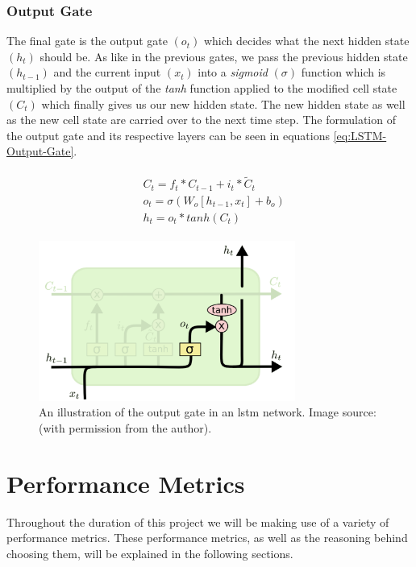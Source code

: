 \subsubsection{Output Gate}
\label{subsubsec:Background-Information:Forecasting-Models:Long-Short-Term-Memory-Networks:Output-Gate}
The final gate is the output gate $(o_t)$ which decides what the next hidden state $(h_t)$ should be. As like in the previous gates, we pass the previous hidden state $(h_{t-1})$ and the current input $(x_t)$ into a \textit{sigmoid} $(\sigma)$ function which is multiplied by the output of the \textit{tanh} function applied to the modified cell state $(C_t)$ which finally gives us our new hidden state. The new hidden state as well as the new cell state are carried over to the next time step. The formulation of the output gate and its respective layers can be seen in equations \ref{eq:LSTM-Output-Gate}.

\begin{align}
    \begin{split}
        & C_t = f_t * C_{t-1} + i_t * \tilde{C}_t \\
        & o_t = \sigma (W_o \left[h_{t-1}, x_t \right] + b_o) \\
        & h_t = o_t * tanh(C_t)
    \end{split}
\label{eq:LSTM-Output-Gate}
\end{align}

\begin{figure}[H]
    \centering
    \includegraphics[width=0.75\textwidth]{Images/Chapter 3/LSTM/LSTM-Output-Gate-Illustration.pdf}
    \caption{An illustration of the output gate in an \gls{lstm} network. Image source: \cite{Colah}  (with permission from the author).}
    \label{fig:LSTM-Output-Gate-Illustration}
\end{figure}

\clearpage

\section{Performance Metrics}
\label{sec:Background-Information:Performance-Metrics}
Throughout the duration of this project we will be making use of a variety of performance metrics. These performance metrics, as well as the reasoning behind choosing them, will be explained in the following sections.

